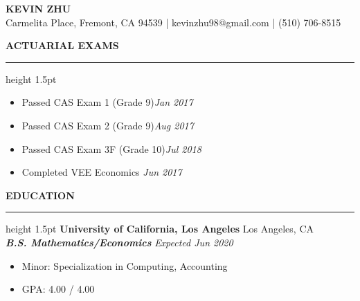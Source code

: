 \documentclass[11pt,letterpaper]{article}
\newcommand{\sectline}{\vspace{3pt}\hrule height 1.5pt\vspace{3pt}}
\newcommand{\sectspace}{\vspace{8pt}}
\begin{document}
\centering
{\fontsize{13pt}{13pt}\selectfont \textbf{KEVIN ZHU}} \vspace{2pt} \\
{\fontsize{12pt}{13pt} Carmelita Place, Fremont, CA 94539 | kevinzhu98@gmail.com | (510) 706-8515}
\sectspace

\fontsize{11pt}{13pt}\selectfont
\raggedright
\textbf{ACTUARIAL EXAMS}\sectline
\begin{itemize}
	\item Passed CAS Exam 1 (Grade 9)\hfill \textit{Jan 2017}
	\item Passed CAS Exam 2 (Grade 9)\hfill \textit{Aug 2017}
	\item Passed CAS Exam 3F (Grade 10)\hfill \textit{Jul 2018}
	\item Completed VEE Economics \hfill \textit{Jun 2017}
\end{itemize}
\sectspace


\textbf{EDUCATION}\sectline
\textbf{University of California, Los Angeles} \hfill Los Angeles, CA \\
\textbf{\textit{B.S. Mathematics/Economics}} \hfill \textit{Expected Jun 2020}
\begin{itemize}
	\item Minor: Specialization in Computing, Accounting
	\item GPA: 4.00 / 4.00
\end{itemize}
\sectspace
\end{document}
